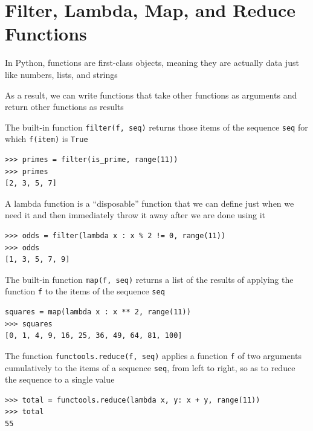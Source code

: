 \documentclass[8pt,a4paper,compress]{beamer}
\begin{document}
\section{Filter, Lambda, Map, and Reduce Functions}
\begin{frame}[fragile]
\pause

In Python, functions are first-class objects, meaning they are actually data just like numbers, lists, and strings

\pause
\bigskip

As a result, we can write functions that take other functions as arguments and return other functions as results

\pause
\bigskip

The built-in function \lstinline{filter(f, seq)} returns those items of the sequence \lstinline{seq} for which \lstinline{f(item)} is \lstinline{True}

\smallskip

\begin{lstlisting}[language={},style=focusin]
>>> primes = filter(is_prime, range(11))
>>> primes
[2, 3, 5, 7]
\end{lstlisting}

\pause
\bigskip

A lambda function is a ``disposable'' function that we can define just when we need it and then immediately throw it away after we are done using it

\smallskip

\begin{lstlisting}[language={},style=focusin]
>>> odds = filter(lambda x : x % 2 != 0, range(11))
>>> odds
[1, 3, 5, 7, 9]
\end{lstlisting}
\end{frame}

\begin{frame}[fragile]
\pause

The built-in function \lstinline{map(f, seq)} returns a list of the results of applying the function \lstinline{f} to the items of the sequence \lstinline{seq}

\smallskip

\begin{lstlisting}[language={},style=focusin]
squares = map(lambda x : x ** 2, range(11))
>>> squares
[0, 1, 4, 9, 16, 25, 36, 49, 64, 81, 100]
\end{lstlisting}

\pause
\bigskip

The function \lstinline{functools.reduce(f, seq)} applies a function \lstinline{f} of two arguments cumulatively to the items of a sequence \lstinline{seq}, from left to right, so as to reduce the sequence to a single value

\smallskip

\begin{lstlisting}[language={},style=focusin]
>>> total = functools.reduce(lambda x, y: x + y, range(11))
>>> total
55
\end{lstlisting}
\end{frame}
\end{document}
